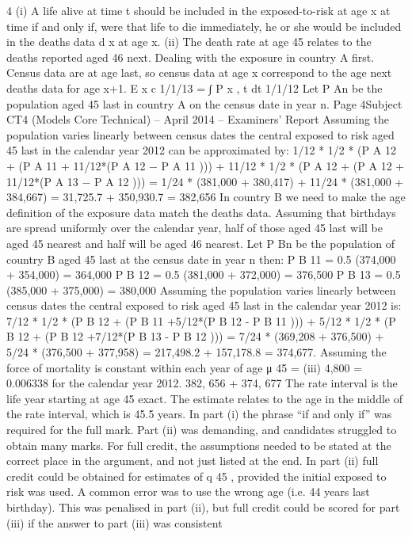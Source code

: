 \documentclass[a4paper,12pt]{article}
\begin{document}
\begin{enumerate}
4
(i) A life alive at time t should be included in the exposed-to-risk at age x at time
if and only if, were that life to die immediately, he or she would be included
in the deaths data d x at age x.
(ii) The death rate at age 45 relates to the deaths reported aged 46 next.
Dealing with the exposure in country A first. Census data are at age last, so
census data at age x correspond to the age next deaths data for age x+1.
E x c
1/1/13
=
∫
P x , t dt
1/1/12
Let P An be the population aged 45 last in country A on the census date in
year n.
Page 4Subject CT4 (Models Core Technical) – April 2014 – Examiners’ Report
Assuming the population varies linearly between census dates the central
exposed to risk aged 45 last in the calendar year 2012 can be approximated by:
1/12 * 1/2 * (P A 12 + (P A 11 + 11/12*(P A 12 − P A 11 ))) +
11/12 * 1/2 * (P A 12 + (P A 12 + 11/12*(P A 13 − P A 12 )))
= 1/24 * (381,000 + 380,417) + 11/24 * (381,000 + 384,667)
= 31,725.7 + 350,930.7
= 382,656
In country B we need to make the age definition of the exposure data match
the deaths data.
Assuming that birthdays are spread uniformly over the calendar year, half of
those aged 45 last will be aged 45 nearest and half will be aged 46 nearest.
Let P Bn be the population of country B aged 45 last at the census date in year
n then:
P B 11 = 0.5 (374,000 + 354,000) = 364,000
P B 12 = 0.5 (381,000 + 372,000) = 376,500
P B 13 = 0.5 (385,000 + 375,000) = 380,000
Assuming the population varies linearly between census dates the central
exposed to risk aged 45 last in the calendar year 2012 is:
7/12 * 1/2 * (P B 12 + (P B 11 +5/12*(P B 12 - P B 11 ))) +
5/12 * 1/2 * (P B 12 + (P B 12 +7/12*(P B 13 - P B 12 )))
= 7/24 * (369,208 + 376,500) + 5/24 * (376,500 + 377,958)
= 217,498.2 + 157,178.8
= 374,677.
Assuming the force of mortality is constant within each year of age
μ 45 =
(iii)
4,800
= 0.006338 for the calendar year 2012.
382, 656 + 374, 677
The rate interval is the life year starting at age 45 exact.
The estimate relates to the age in the middle of the rate interval, which is 45.5
years.
In part (i) the phrase “if and only if” was required for the full mark. Part (ii) was
demanding, and candidates struggled to obtain many marks. For full credit, the assumptions
needed to be stated at the correct place in the argument, and not just listed at the end. In
part (ii) full credit could be obtained for estimates of q 45 , provided the initial exposed to risk
was used.
A common error was to use the wrong age (i.e. 44 years last birthday). This was penalised in
part (ii), but full credit could be scored for part (iii) if the answer to part (iii) was consistent

\end{enumerate}
\end{document}
